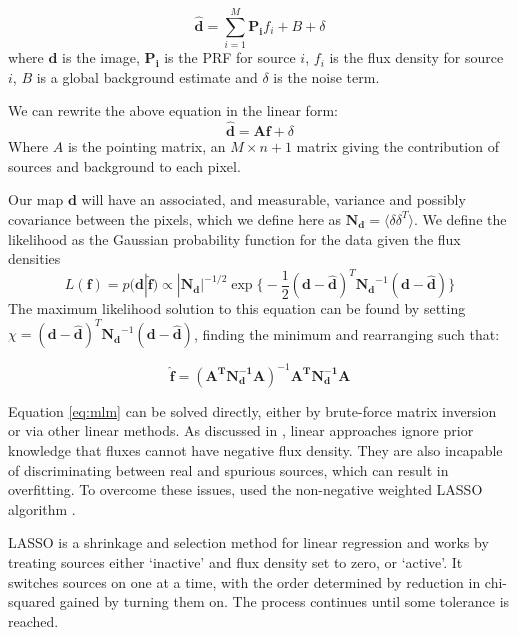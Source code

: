 \documentclass[useAMS,usenatbib]{mnras}
\begin{document}
\begin{equation}
\hat{\mathbf{d}} = \sum\limits_{i=1}^M \mathbf{P_i}f_i + B + \delta
\label{eq:map}
\end{equation}
where $\mathbf{d}$ is the image, $\mathbf{P_i}$ is the PRF for source $i$, $f_i$ is the flux density for source $i$, $B$ is a global background estimate and $\delta$ is the noise term.

We can rewrite the above equation in the linear form:
\begin{equation}
\hat{\mathbf{d}} = \mathbf{Af} + \delta
\label{eq:map2}
\end{equation}
Where $A$ is the pointing matrix, an $M \times n+1$ matrix giving the contribution of sources and background to each pixel.

Our map $\mathbf{d}$ will have an associated, and measurable, variance and possibly covariance between the pixels, which we define here as $\mathbf{N_d} = \langle\delta\delta^T\rangle$. We define the likelihood as the Gaussian probability function for the data given the flux densities
\begin{equation}
L(\mathbf{f}) = p(\mathbf{d}|\hat{\mathbf{f}}) \propto |\mathbf{N_d}|^{-1/2} \exp\big\{ -\frac{1}{2}(\mathbf{d}-\hat{\mathbf{d}})^T\mathbf{N_d}^{-1}(\mathbf{d}-\hat{\mathbf{d}})\big\}\label{eq:likelihood}
\end{equation}
The maximum likelihood solution to this equation can be found by setting $\chi = (\mathbf{d}-\hat{\mathbf{d}})^T\mathbf{N_d}^{-1}(\mathbf{d}-\hat{\mathbf{d}})$, finding the minimum and rearranging such that:

\begin{equation}
\hat{\mathbf{f}}=(\mathbf{A^TN_d^{-1}A})^{-1}\mathbf{A^TN_d^{-1}A}\label{eq:mlm}
\end{equation}

Equation \ref{eq:mlm} can be solved directly, either by brute-force matrix inversion or via other linear methods. As discussed in \cite{Roseboom:2010, Roseboom:2011, Wang:2014}, linear approaches ignore prior knowledge that fluxes cannot have negative flux density.%
 They are also incapable of discriminating between real and spurious sources, which can result in overfitting. To overcome these issues, \cite{Roseboom:2011} used the non-negative weighted LASSO algorithm \citep{Tibshirani:1996, Zou:2006, terBraak:2010}.

LASSO is a shrinkage and selection method for linear regression and works by treating sources either `inactive' and flux density set to zero, or `active'. It switches sources on one at a time, with the order determined by reduction in chi-squared gained by turning them on. The process continues until some tolerance is reached.
\end{document}
